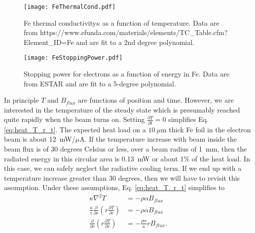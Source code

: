 \documentclass[12pt]{article}
\begin{document}
\begin{figure}[h]
\centering
\texttt{[image: FeThermalCond.pdf]}
\caption{\label{fig:conductivity} Fe thermal conductivity$\kappa$ as a function of temperature. Data are from https://www.efunda.com/materials/elements/TC\_Table.cfm?Element\_ID=Fe and are fit to a 2nd degree polynomial.}
\end{figure}
\begin{figure}[h]
\centering
\texttt{[image: FeStoppingPower.pdf]}
\caption{\label{fig:stopping}Stopping power for electrons as a function of energy in Fe. Data are from ESTAR and are fit to a 5-degree polynomial.}
\end{figure}
In principle $T$ and $B_{flux}$ are functions of position and time. However, we are interested in the temperature of the steady state which is presumably reached quite rapidly when the beam turns on. Setting $\frac{\partial T}{\partial t}=0$ simplifies Eq. \ref{eq:heat_T_r_t}. The expected heat load on a $10~\mu$m thick Fe foil in the electron beam is about 12~mW/$\mu$A. If the temperature increase with beam inside the beam flux is of 30 degrees Celsius or less, over a beam radius of 1~mm, then the radiated energy in this circular area is 0.13~mW or about 1\% of the heat load. In this case, we can safely neglect the radiative cooling term. If we end up with a temperature increase greater than 30 degrees, then we will have to revisit this assumption. Under these assumptions, Eq. \ref{eq:heat_T_r_t} simplifies to  
\begin{align}
\kappa\nabla^2T&=-\rho\alpha B_{flux}\\
\frac{\kappa}{r}\frac{\partial}{\partial r}\left(r\frac{\partial T}{\partial r}\right)&=-\rho\alpha B_{flux}\\
\label{eq:heat_T_r}
\frac{\partial}{\partial r}\left(r\frac{\partial T}{\partial r}\right)&=-\frac{\rho\alpha}{\kappa}rB_{flux}.
\end{align}
\end{document}

